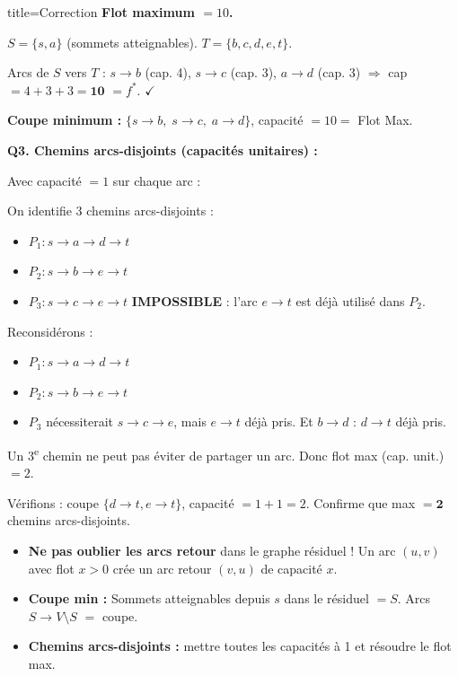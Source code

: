 \documentclass[12pt,a4paper]{article}
\begin{document}
\begin{correction}{title=Correction}
\textbf{Flot maximum $= 10$.}

$S = \{s, a\}$ (sommets atteignables). $T = \{b, c, d, e, t\}$.

Arcs de $S$ vers $T$ : $s \to b$ (cap. 4), $s \to c$ (cap. 3), $a \to d$ (cap. 3) $\Rightarrow$ cap $= 4+3+3 = \mathbf{10}$ $= f^*$. $\checkmark$

\textbf{Coupe minimum :} $\{s \to b,\; s \to c,\; a \to d\}$, capacit\'e $= 10 = $ Flot Max. \checkmark

\medskip
\textbf{Q3. Chemins arcs-disjoints (capacit\'es unitaires) :}

Avec capacit\'e $= 1$ sur chaque arc :

On identifie 3 chemins arcs-disjoints :
\begin{itemize}
    \item $P_1 : s \to a \to d \to t$
    \item $P_2 : s \to b \to e \to t$
    \item $P_3 : s \to c \to e \to t$ \quad \textcolor{importantrouge}{\textbf{IMPOSSIBLE}} : l'arc $e \to t$ est d\'ej\`a utilis\'e dans $P_2$.
\end{itemize}

Reconsid\'erons :
\begin{itemize}
    \item $P_1 : s \to a \to d \to t$
    \item $P_2 : s \to b \to e \to t$
    \item $P_3$ n\'ecessiterait $s \to c \to e$, mais $e \to t$ d\'ej\`a pris. Et $b \to d$ : $d \to t$ d\'ej\`a pris.
\end{itemize}

Un 3\textsuperscript{e} chemin ne peut pas \'eviter de partager un arc. Donc flot max (cap. unit.) $= 2$.

V\'erifions : coupe $\{d \to t, e \to t\}$, capacit\'e $= 1+1 = 2$. Confirme que max $= \mathbf{2}$ chemins arcs-disjoints.
\end{correction}

\begin{attention}
\begin{itemize}
    \item \textbf{Ne pas oublier les arcs retour} dans le graphe r\'esiduel ! Un arc $(u,v)$ avec flot $x > 0$ cr\'ee un arc retour $(v,u)$ de capacit\'e $x$.
    \item \textbf{Coupe min :} Sommets atteignables depuis $s$ dans le r\'esiduel $= S$. Arcs $S \to V \setminus S$ $=$ coupe.
    \item \textbf{Chemins arcs-disjoints :} mettre toutes les capacit\'es \`a 1 et r\'esoudre le flot max.
\end{itemize}
\end{attention}
\end{document}
